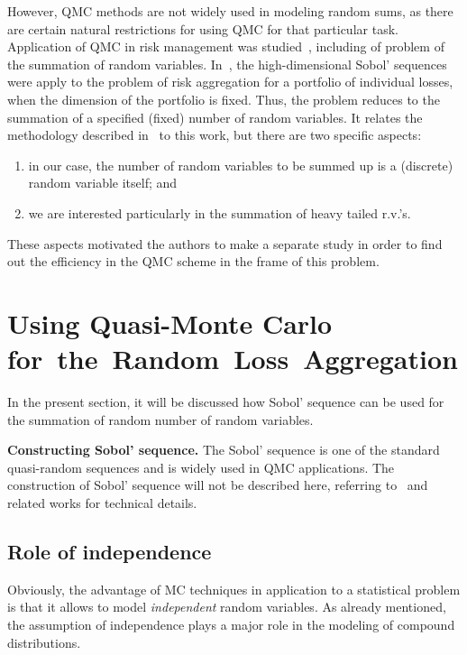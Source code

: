 \begin{multicols}{2}
However, QMC methods are not widely used in modeling random sums,
as there are certain natural restrictions for using QMC for that
particular task. Application of QMC in risk management was studied~\cite{Prakash},
including of problem of the summation of random
variables. In~\cite{Prakash}, the high-dimensional Sobol' sequences
were apply to the problem of risk aggregation for a portfolio of
individual losses, when the dimension of the portfolio is fixed.
Thus, the problem reduces to the summation of a specified (fixed)
number of random variables. It relates the methodology described in~\cite{Prakash}
to this work, but there are two specific aspects:
\begin{enumerate}[(1)]
\item in our case, the number of random variables to be summed up
is a (discrete) random variable itself; and
\item we are interested particularly in the summation of heavy tailed
r.v.'s.
\end{enumerate}
These aspects motivated the authors to make a separate study in order to find
out the efficiency in the QMC scheme in the frame of this problem.

\section{Using Quasi-Monte Carlo
for~the~Random~Loss~Aggregation}

\noindent
In the present section, it will be discussed how Sobol' sequence can be used
for the summation of random number of random variables.

\medskip

\noindent
\textbf{Constructing Sobol' sequence.}
The Sobol' sequence is one of the standard quasi-random sequences
and is widely used in QMC applications. The construction of Sobol' sequence
will not be described here, referring to~\cite{Sob1, Sob2}
and related works for technical details.

\subsection{Role of independence}

\noindent
Obviously, the advantage of MC techniques in application to a
statistical problem is that it allows to model {\it independent}
random variables. As already mentioned, the assumption of
independence plays a major role in the modeling of compound
distributions.


\end{multicols}
